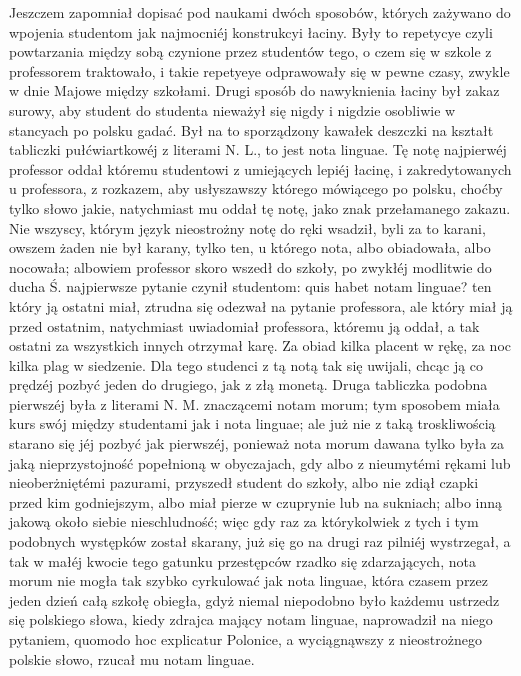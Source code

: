 \documentclass{book}
\begin{document}
Jeszczem zapomniał dopisać pod naukami dwóch sposobów, których zażywano do wpojenia studentom jak najmocniéj konstrukcyi łaciny. Były to repetycye czyli powtarzania między sobą czynione przez studentów tego, o czem się w szkole z professorem traktowało, i takie repetyeye odprawowały się w pewne czasy, zwykle w dnie Majowe między szkołami. Drugi sposób do nawyknienia łaciny był zakaz surowy, aby student do studenta nieważył się nigdy i nigdzie osobliwie w stancyach po polsku gadać. Był na to sporządzony kawałek deszczki na kształt tabliczki pułćwiartkowéj z literami N. L., to jest nota linguae. Tę notę najpierwéj professor oddał któremu studentowi z umiejących lepiéj łacinę, i zakredytowanych u professora, z rozkazem, aby usłyszawszy którego mówiącego po polsku, choćby tylko słowo jakie, natychmiast mu oddał tę notę, jako znak przełamanego zakazu. Nie wszyscy, którym język nieostrożny notę do ręki wsadził, byli za to karani, owszem żaden nie był karany, tylko ten, u którego nota, albo obiadowała, albo nocowała; albowiem professor skoro wszedł do szkoły, po zwykłéj modlitwie do ducha Ś. najpierwsze pytanie czynił studentom: quis habet notam linguae? ten który ją ostatni miał, ztrudna się odezwał na pytanie professora, ale który miał ją przed ostatnim, natychmiast uwiadomiał professora, któremu ją oddał, a tak ostatni za wszystkich innych otrzymał karę. Za obiad kilka placent w rękę, za noc kilka plag w siedzenie. Dla tego studenci z tą notą tak się uwijali, chcąc ją co prędzéj pozbyć jeden do drugiego, jak z złą monetą. Druga tabliczka podobna pierwszéj była z literami N. M. znaczącemi notam morum; tym sposobem miała kurs swój między studentami jak i nota linguae; ale już nie z taką troskliwością starano się jéj pozbyć jak pierwszéj, ponieważ nota morum dawana tylko była za jaką nieprzystojność popełnioną w obyczajach, gdy albo z nieumytémi rękami lub nieoberżniętémi pazurami, przyszedł student do szkoły, albo nie zdiął czapki przed kim godniejszym, albo miał pierze w czuprynie lub na sukniach; albo inną jakową około siebie nieschludność; więc gdy raz za którykolwiek z tych i tym podobnych występków został skarany, już się go na drugi raz pilniéj wystrzegał, a tak w małéj kwocie tego gatunku przestępców rzadko się zdarzających, nota morum nie mogła tak szybko cyrkulować jak nota linguae, która czasem przez jeden dzień całą szkołę obiegła, gdyż niemal niepodobno było każdemu ustrzedz się polskiego słowa, kiedy zdrajca mający notam linguae, naprowadził na niego pytaniem, quomodo hoc explicatur Polonice, a wyciągnąwszy z nieostrożnego polskie słowo, rzucał mu notam linguae.
\end{document}
